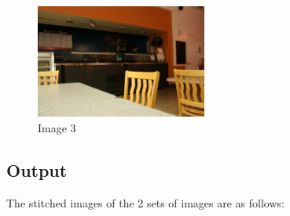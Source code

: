 \documentclass[12pt]{article}
\begin{document}
\begin{figure}[htp]
\centering
\includegraphics[width=0.5\textwidth]{test7.jpg}\hfill
\caption{Image 3}
\end{figure}

\clearpage

\subsection{Output}
The stitched images of the 2 sets of images are as follows:
\end{document}
